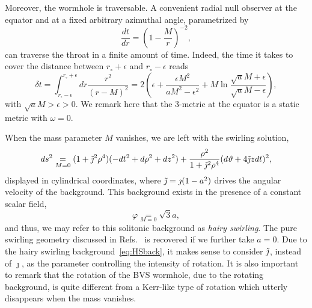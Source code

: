 \documentclass[aps,preprint,groupedaddress,nofootinbib,superscriptaddress,showkeys,showpacs,eqsecnum,amsmath,amssymb]{revtex4-1}
\begin{document}
Moreover, the wormhole is traversable. A convenient radial null observer at the equator and at a fixed arbitrary azimuthal angle, parametrized by 
\begin{equation}
    \frac{dt}{dr}=\left(1-\frac{M}{r}\right)^{-2},
\end{equation}
can traverse the throat in a finite amount of time. Indeed, the time it takes to cover the distance between $r_\circ+\epsilon$ and $r_\circ-\epsilon$ reads 
\begin{equation}
    \delta t= \int_{r_\circ-\epsilon}^{r_\circ + \epsilon}dr \frac{r^2}{(r-M)^2} = 2\left( \epsilon + \frac{\epsilon M^2}{a M^2 - \epsilon^2}+M\ln \frac{\sqrt{a} M+\epsilon}{\sqrt{a} M -\epsilon}\right),
\end{equation}
with $\sqrt{a}M>\epsilon>0$. We remark here that the 3-metric at the equator is a static metric with $\omega=0$. 

When the mass parameter $M$ vanishes, we are left with the swirling solution,
\begin{equation}
    ds^2 \underset{M=0}{=} (1+\tilde{\jmath}^2\rho^4)(-dt^2+d\rho^2+dz^2)+\frac{\rho^2}{1+\Tilde{\jmath}^2\rho^4}(d\vartheta + 4 \Tilde{\jmath}z dt)^2,\label{eq:HSback}
\end{equation}
displayed in cylindrical coordinates, where $\Tilde{\jmath}=\jmath (1-a^2)$ drives the angular velocity of the background. This background exists in the presence of a constant scalar field,
\begin{equation}
    \varphi \underset{M=0}{=} \sqrt{3}a,
\end{equation}
and thus, we may refer to this solitonic background as \emph{hairy swirling}. The pure swirling geometry discussed in Refs.~\cite{Astorino:2022aam,Gibbons:2013yq} is recovered if we further take $a=0$. Due to the hairy swirling background~\eqref{eq:HSback}, it makes sense to consider $\Tilde{\jmath}$, instead of $\jmath$, as the parameter controlling the intensity of rotation. It is also important to remark that the rotation of the BVS wormhole, due to the rotating background, is quite different from a Kerr-like type of rotation which utterly disappears when the mass vanishes. 
\end{document}
